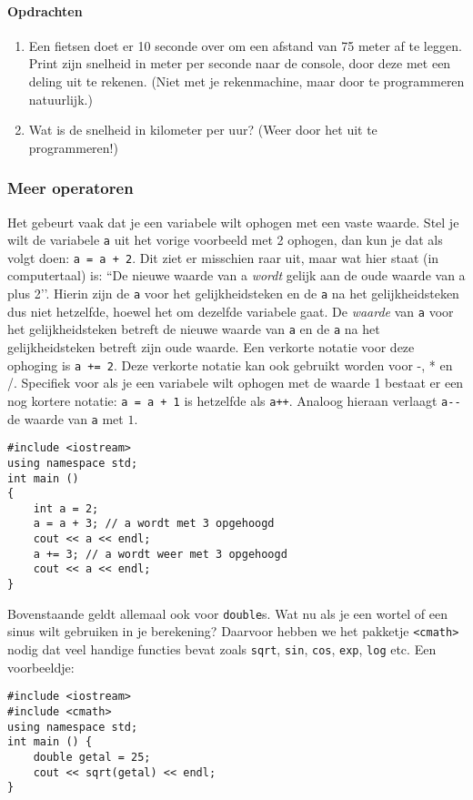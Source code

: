 \documentclass[12pt,a4paper]{article}
\newcommand{\icode}{\lstinline}
\begin{document}
\paragraph{Opdrachten}
\begin{enumerate}
\item
	Een fietsen doet er 10 seconde over om een afstand van 75 meter af te leggen. Print zijn snelheid in meter per seconde naar de console, door deze met een deling uit te rekenen. (Niet met je rekenmachine, maar door te programmeren natuurlijk.) 
\item 
	Wat is de snelheid in kilometer per uur? (Weer door het uit te programmeren!)
\end{enumerate} 

\subsubsection{Meer operatoren}
Het gebeurt vaak dat je een variabele wilt ophogen met een vaste waarde. Stel je wilt de 
variabele \icode{a} uit het vorige voorbeeld met 2 ophogen, dan kun je dat als volgt doen: \icode{a = a + 2}. Dit ziet er misschien raar uit, maar wat hier staat (in computertaal) is: ``De nieuwe waarde 
van a \emph{wordt} gelijk aan de oude waarde van a plus 2’’. Hierin zijn de \icode{a} voor het 
gelijkheidsteken en de \icode{a} na het gelijkheidsteken dus niet hetzelfde, hoewel het om dezelfde 
variabele gaat. De \emph{waarde} van \icode{a} voor het gelijkheidsteken betreft de nieuwe waarde 
van \icode{a} en de \icode{a} na het gelijkheidsteken betreft zijn oude waarde. Een verkorte notatie
voor deze ophoging is \icode{a += 2}.
Deze verkorte notatie kan ook gebruikt worden voor -, * en /.
Specifiek voor als je een variabele wilt ophogen met de waarde 
1 bestaat er een nog kortere notatie: \icode{a = a + 1} is hetzelfde als \icode{a++}. 
Analoog hieraan verlaagt \icode{a--} de waarde van \icode{a} met $1$.
\begin{lstlisting}
#include <iostream> 
using namespace std; 
int main () 
{
	int a = 2; 
	a = a + 3; // a wordt met 3 opgehoogd
	cout << a << endl; 
	a += 3; // a wordt weer met 3 opgehoogd 
	cout << a << endl; 
}
\end{lstlisting}
Bovenstaande geldt allemaal ook voor \icode{double}s. Wat nu als je een wortel of een sinus wilt gebruiken 
in je berekening? Daarvoor hebben we het pakketje \icode{<cmath>} nodig dat veel handige functies 
bevat zoals \icode{sqrt}, \icode{sin}, \icode{cos}, \icode{exp}, \icode{log} etc. Een voorbeeldje: 
\begin{lstlisting}
#include <iostream> 
#include <cmath>
using namespace std; 
int main () {
	double getal = 25; 
	cout << sqrt(getal) << endl; 
}
\end{lstlisting}
\end{document}
